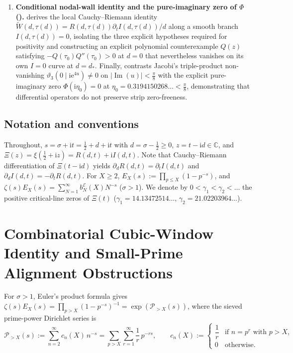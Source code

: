\documentclass[11pt,reqno]{amsart}
\theoremstyle{plain}
\theoremstyle{definition}
\theoremstyle{remark}
\numberwithin{equation}{section}
\newcommand{\ii}{\mathrm{i}}
\newcommand{\ee}{\mathrm{e}}
\DeclareMathOperator{\Imop}{Im}
\begin{document}
\begin{enumerate}[label=\textup{(\arabic*)},leftmargin=2.2em]
\item \textbf{Conditional nodal-wall identity and the pure-imaginary zero of $\Phi$ ().}  derives the local Cauchy--Riemann identity $\widetilde{W}(d,\tau(d)) = R(d,\tau(d))\partial_t I(d,\tau(d))/d$ along a smooth branch $I(d,\tau(d)) = 0$, isolating the three explicit hypotheses required for positivity and constructing an explicit polynomial counterexample $Q(z)$ satisfying $-Q(\tau_0)Q''(\tau_0) > 0$ at $d = 0$ that nevertheless vanishes on its own $I = 0$ curve at $d = d_*$. Finally,  contrasts Jacobi's triple-product non-vanishing $\vartheta_3(0 \mid \ii\ee^{4u}) \neq 0$ on $\lvert\Imop(u)\rvert < \frac{\pi}{8}$ with the explicit pure-imaginary zero $\Phi(\ii\eta_0) = 0$ at $\eta_0 = 0.3194150268\dots < \frac{\pi}{8}$, demonstrating that differential operators do not preserve strip zero-freeness.
\end{enumerate}

\subsection{Notation and conventions}\label{subsec:notation}

Throughout, $s = \sigma + \ii t = \frac{1}{2} + d + \ii t$ with $d = \sigma - \frac{1}{2} \ge 0$, $z = t - \ii d \in \mathbb{C}$, and $\Xi(z) = \xi(\frac{1}{2} + \ii z) = R(d,t) + \ii I(d,t)$. Note that Cauchy--Riemann differentiation of $\Xi(t - \ii d)$ yields $\partial_d R(d,t) = \partial_t I(d,t)$ and $\partial_d I(d,t) = -\partial_t R(d,t)$. For $X \ge 2$, $E_X(s) := \prod_{p \le X}(1 - p^{-s})$, and $\zeta(s)E_X(s) = \sum_{N=1}^{\infty} b_N^{\mathcal{E}}(X)N^{-s}$ ($\sigma > 1$). We denote by $0 < \gamma_1 < \gamma_2 < \dots$ the positive critical-line zeros of $\Xi(t)$ ($\gamma_1 = 14.13472514\dots$, $\gamma_2 = 21.02203964\dots$).

\section{Combinatorial Cubic-Window Identity and Small-Prime Alignment Obstructions}\label{sec:cubic}

For $\sigma > 1$, Euler's product formula gives $\zeta(s)E_X(s) = \prod_{p > X}(1 - p^{-s})^{-1} = \exp(\mathcal{P}_{>X}(s))$, where the sieved prime-power Dirichlet series is
\begin{equation}\label{eq:prime_dirichlet}
\mathcal{P}_{>X}(s) := \sum_{n=2}^{\infty} c_n(X)\,n^{-s} = \sum_{p > X}\sum_{r=1}^{\infty} \frac{1}{r}\,p^{-rs}, \qquad c_n(X) := \begin{cases} \dfrac{1}{r} & \text{if } n = p^r \text{ with } p > X, \\[4pt] 0 & \text{otherwise.} \end{cases}
\end{equation}
\end{document}
